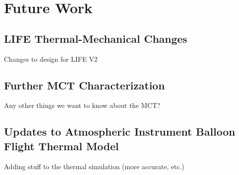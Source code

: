 \chapter{Future Work} \label{future}

\section{LIFE Thermal-Mechanical Changes}
Changes to design for LIFE V2

\section{Further MCT Characterization}
Any other things we want to know about the MCT?

\section{Updates to Atmospheric Instrument Balloon Flight Thermal Model} Adding stuff to the thermal simulation (more accurate, etc.)